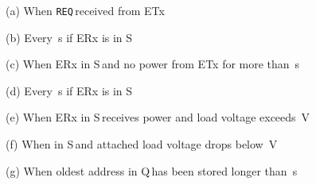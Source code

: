 \documentclass[11pt,draftclsnofoot,journal,onecolumn]{IEEEtran}
\newcommand{\textsubscript}[1]{}
\newcommand{\rxStateIdle}{\textsf{S\textsubscript{IDLE}}\,}
\newcommand{\rxStateWaiting}{\textsf{S\textsubscript{WAIT}}\,}
\newcommand{\rxStateCharged}{\textsf{S\textsubscript{CHARGED}}\,}
\newcommand{\rxDelayPing}{}
\newcommand{\rxDelayRemoveLastProbeSender}{}
\newcommand{\rxDelayWaitingForPower}{}
\newcommand{\rxDelayPowerProbing}{}
\newcommand{\rxVoltageThreshold}{}
\newcommand{\powerProbeRequest}{\texttt{REQ\textsubscript{PWR}}\,}
\newcommand{\txAddressQueue}{Q\textsubscript{TX}\,}
\begin{document}
\begin{algorithm}[t]
\begin{threeparttable}[b]
\begin{tablenotes}
	\item[(a)] When \powerProbeRequest received from ETx 
	\item[(b)] Every \rxDelayPing\,s if ERx is in \rxStateIdle
	\item[(c)] When ERx in \rxStateWaiting and no power from ETx for more than \rxDelayWaitingForPower\,s
	\item[(d)] Every \rxDelayPowerProbing\,s if ERx is in \rxStateCharged
	\item[(e)] When ERx in \rxStateWaiting receives power and load voltage exceeds \rxVoltageThreshold\,V
	\item[(f)] When in \rxStateCharged and attached load voltage drops below \rxVoltageThreshold\,V
	\item[(g)] When oldest address in \txAddressQueue has been stored longer than \rxDelayRemoveLastProbeSender\,s
\end{tablenotes}
\end{threeparttable}

\end{algorithm}
\end{document}
